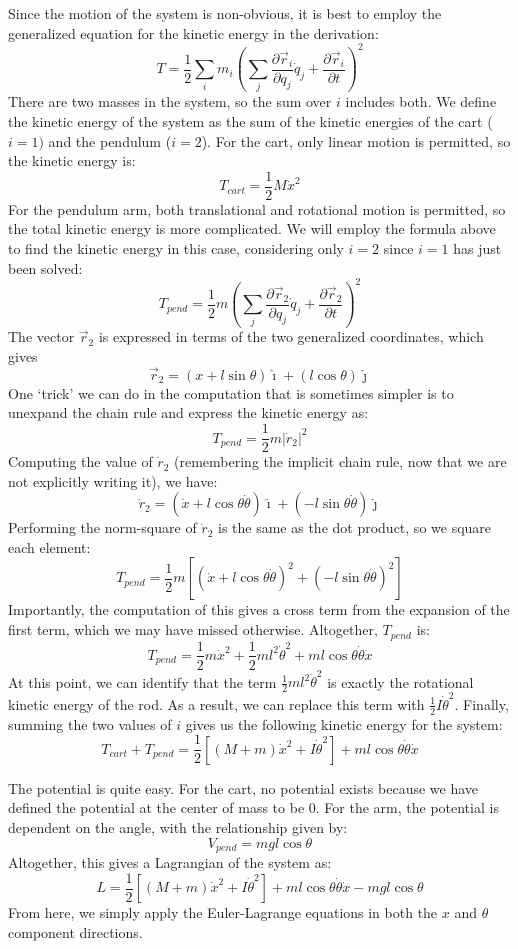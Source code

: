 Since the motion of the system is non-obvious, it is best to employ the generalized equation for the kinetic energy in the derivation:
$$T=\frac{1}{2}\sum_im_i\left(\sum_j\frac{\partial\vec{r}_i}{\partial q_j}\dot{q}_j+\frac{\partial \vec{r}_i}{\partial t}\right)^2$$
There are two masses in the system, so the sum over $i$ includes both. We define the kinetic energy of the system as the sum of the kinetic energies of the cart ($i=1)$ and the pendulum ($i=2$). For the cart, only linear motion is permitted, so the kinetic energy is:
$$T_{cart}=\frac{1}{2}M\dot{x}^2$$
For the pendulum arm, both translational and rotational motion is permitted, so the total kinetic energy is more complicated. We will employ the formula above to find the kinetic energy in this case, considering only $i=2$ since $i=1$ has just been solved:
$$T_{pend}=\frac{1}{2}m\left(\sum_j\frac{\partial\vec{r}_2}{\partial q_j}\dot{q}_j+\frac{\partial \vec{r}_2}{\partial t}\right)^2$$
The vector $\vec{r}_2$ is expressed in terms of the two generalized coordinates, which gives 
$$\vec{r}_2=(x+l\sin\theta)\hat{\imath}+(l\cos\theta)\hat{\jmath}$$
One `trick' we can do in the computation that is sometimes simpler is to unexpand the chain rule and express the kinetic energy as:
$$T_{pend}=\frac{1}{2}m|\dot{r}_2|^2$$
Computing the value of $\dot{r}_2$ (remembering the implicit chain rule, now that we are not explicitly writing it), we have:
$$\dot{r}_2=(\dot{x}+l\cos\theta\dot{\theta})\hat{\imath}+(-l\sin\theta\dot{\theta})\hat{\jmath}$$
Performing the norm-square of $\dot{r}_2$ is the same as the dot product, so we square each element:
$$T_{pend}=\frac{1}{2}m\left[(\dot{x}+l\cos\theta\dot{\theta})^2+(-l\sin\theta\dot{\theta})^2\right]$$
Importantly, the computation of this gives a cross term from the expansion of the first term, which we may have missed otherwise. Altogether, $T_{pend}$ is:
$$T_{pend}=\frac{1}{2}m\dot{x}^2+\frac{1}{2}ml^2\dot{\theta}^2+ml\cos\theta\dot\theta\dot{x}$$
At this point, we can identify that the term $\frac{1}{2}ml^2\dot{\theta}^2$ is exactly the rotational kinetic energy of the rod. As a result, we can replace this term with $\frac{1}{2}I\dot{\theta}^2$. Finally, summing the two values of $i$ gives us the following kinetic energy for the system:
$$T_{cart}+T_{pend}=\frac{1}{2}\left[\left(M+m\right)\dot{x}^2+I\dot{\theta}^2\right]+ml\cos\theta\dot{\theta}\dot{x}$$

The potential is quite easy. For the cart, no potential exists because we have defined the potential at the center of mass to be $0$. For the arm, the potential is dependent on the angle, with the relationship given by:
$$V_{pend}=mgl\cos{\theta}$$
Altogether, this gives a \gls{Lagrangian} of the system as:
$$L=\frac{1}{2}\left[\left(M+m\right)\dot{x}^2+I\dot{\theta}^2\right]+ml\cos\theta\dot{\theta}\dot{x}-mgl\cos{\theta}$$
From here, we simply apply the Euler-Lagrange equations in both the $x$ and $\theta$ component directions.
